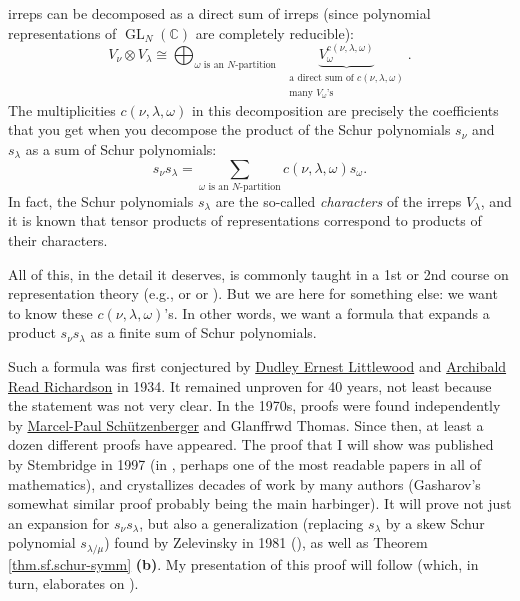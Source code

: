 irreps can be decomposed as a direct sum of irreps (since polynomial
representations of $\operatorname*{GL}\nolimits_{N}\left(  \mathbb{C}\right)
$ are completely reducible):%
\[
V_{\nu}\otimes V_{\lambda}\cong\bigoplus_{\omega\text{ is an }%
N\text{-partition}}\ \ \underbrace{V_{\omega}^{c\left(  \nu,\lambda
,\omega\right)  }}_{\substack{\text{a direct sum of }c\left(  \nu
,\lambda,\omega\right)  \\\text{many }V_{\omega}\text{'s}}}.
\]
The multiplicities $c\left(  \nu,\lambda,\omega\right)  $ in this
decomposition are precisely the coefficients that you get when you decompose
the product of the Schur polynomials $s_{\nu}$ and $s_{\lambda}$ as a sum of
Schur polynomials:%
\[
s_{\nu}s_{\lambda}=\sum_{\omega\text{ is an }N\text{-partition}}c\left(
\nu,\lambda,\omega\right)  s_{\omega}.
\]
In fact, the Schur polynomials $s_{\lambda}$ are the so-called
\emph{characters} of the irreps $V_{\lambda}$, and it is known that tensor
products of representations correspond to products of their characters.

All of this, in the detail it deserves, is commonly taught in a 1st or 2nd
course on representation theory (e.g., \cite{Proces07} or \cite{EGHetc11} or
\cite[Chapter 6]{Prasad-rep}). But we are here for something else: we want to
know these $c\left(  \nu,\lambda,\omega\right)  $'s. In other words, we want a
formula that expands a product $s_{\nu}s_{\lambda}$ as a finite sum of Schur polynomials.

Such a formula was first conjectured by
\href{https://mathshistory.st-andrews.ac.uk/Biographies/Littlewood_Dudley/}{Dudley
Ernest Littlewood} and
\href{https://mathshistory.st-andrews.ac.uk/Biographies/Richardson_Archibald/}{Archibald
Read Richardson} in 1934. It remained unproven for 40 years, not least because
the statement was not very clear. In the 1970s, proofs were found
independently by
\href{https://mathshistory.st-andrews.ac.uk/Biographies/Schutzenberger/}{Marcel-Paul
Sch\"{u}tzenberger} and Glanffrwd Thomas. Since then, at least a dozen
different proofs have appeared. The proof that I will show was published by
Stembridge in 1997 (in \cite{Stembr02}, perhaps one of the most readable
papers in all of mathematics), and crystallizes decades of work by many
authors (Gasharov's somewhat similar proof \cite{Gashar98} probably being the
main harbinger). It will prove not just an expansion for $s_{\nu}s_{\lambda}$,
but also a generalization (replacing $s_{\lambda}$ by a skew Schur polynomial
$s_{\lambda/\mu}$) found by Zelevinsky in 1981 (\cite{Zelevi81}), as well as
Theorem \ref{thm.sf.schur-symm} \textbf{(b)}. My presentation of this proof
will follow \cite[\S 2.6]{GriRei} (which, in turn, elaborates on
\cite{Stembr02}).

